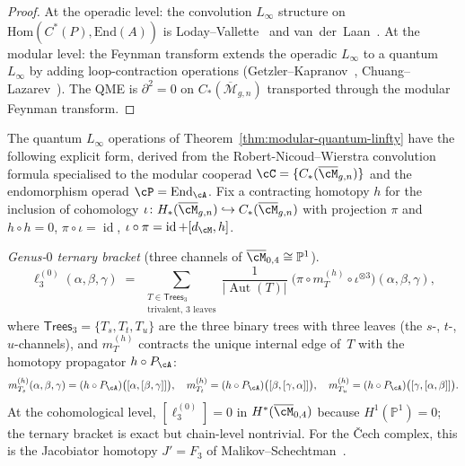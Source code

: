 \begin{proof}
At the operadic level: the convolution $L_\infty$ structure on
$\mathrm{Hom}(C^*(P), \mathrm{End}(A))$ is
Loday--Vallette~\cite[Theorem~10.3.8]{LV12} and
van~der~Laan~\cite{vdL03}.
At the modular level: the Feynman transform extends the operadic
$L_\infty$ to a quantum $L_\infty$ by adding loop-contraction
operations
(Getzler--Kapranov~\cite[\S5]{GeK98},
Chuang--Lazarev~\cite{CL10}).
The QME is $\partial^2 = 0$ on
$C_*(\overline{\mathcal{M}}_{g,n})$ transported through the
modular Feynman transform.
\end{proof}

\begin{construction}
\label{constr:explicit-convolution-linfty}
The quantum $L_\infty$ operations of
Theorem~\textup{\ref{thm:modular-quantum-linfty}} have the following
explicit form, derived from the Robert-Nicoud--Wierstra convolution
formula \cite[Theorem~5.1]{RNW19} specialised to the modular
cooperad $\cC = \{C_*(\overline{\cM}_{g,n})\}$ and the
endomorphism operad $\cP = \operatorname{End}_{\cA}$.  Fix a contracting
homotopy $h$ for the inclusion of cohomology
$\iota\colon H_*(\overline{\cM}_{g,n}) \hookrightarrow
C_*(\overline{\cM}_{g,n})$ with projection $\pi$ and
$h \circ h = 0$, $\pi \circ \iota = \operatorname{id}$,
$\iota \circ \pi = \operatorname{id} + [d_{\cM}, h]$.

\emph{Genus-$0$ ternary bracket}
\textup{(}three channels of $\overline{\cM}_{0,4} \cong \mathbb{P}^1$\textup{)}.
\begin{equation}
\label{eq:ell3-explicit}
\ell_3^{(0)}(\alpha,\beta,\gamma)
\;=\;
\sum_{\substack{T \in \mathsf{Trees}_3 \\ \text{trivalent, 3 leaves}}}
\frac{1}{|\operatorname{Aut}(T)|}
\;\bigl(\pi \circ m_T^{(h)} \circ \iota^{\otimes 3}\bigr)
(\alpha,\beta,\gamma),
\end{equation}
where $\mathsf{Trees}_3 = \{T_s, T_t, T_u\}$ are the three binary
trees with three leaves (the $s$-, $t$-, $u$-channels), and
$m_T^{(h)}$ contracts the unique internal edge of~$T$ with the
homotopy propagator $h \circ P_{\cA}$:
\[
m_{T_s}^{(h)}(\alpha,\beta,\gamma)
= (h \circ P_{\cA})\bigl([\alpha, [\beta, \gamma]]\bigr), \quad
m_{T_t}^{(h)}
= (h \circ P_{\cA})\bigl([\beta, [\gamma, \alpha]]\bigr), \quad
m_{T_u}^{(h)}
= (h \circ P_{\cA})\bigl([\gamma, [\alpha, \beta]]\bigr).
\]
At the cohomological level,
$[\ell_3^{(0)}] = 0$ in $H^*(\overline{\cM}_{0,4})$ because
$H^1(\mathbb{P}^1) = 0$; the ternary bracket is exact but
chain-level nontrivial.  For the \v{C}ech complex, this is the
Jacobiator homotopy $J' = F_3$ of
Malikov--Schechtman~\cite{MS24}.


\end{construction}
